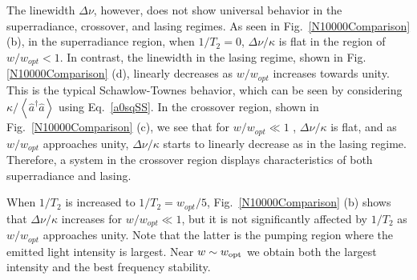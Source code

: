 \documentclass[aps,
twocolumn,
showpacs,
superscriptaddress,groupedaddress]{revtex4}
\begin{document}
The linewidth $\Delta \nu$, however, does not show universal behavior in
the superradiance, crossover, and lasing regimes. As seen in
Fig.~\ref{N10000Comparison} (b), in the superradiance region, when
$1/T_2=0$, $\Delta \nu / \kappa$ is flat in the region of $w/w_{opt}<1$.
In contrast, the linewidth in the lasing regime, shown in
Fig.\ref{N10000Comparison} (d), linearly decreases as $w/w_{opt}$
increases towards unity. This is the typical Schawlow-Townes behavior,
which can be seen by considering
$\kappa/\left<\hat{a}^{\dagger}\hat{a}\right>$ using Eq.~\ref{a0sqSS}.
In the crossover region, shown in Fig.~\ref{N10000Comparison} (c), we
see that for $w/w_{opt}\ll 1$ , $\Delta \nu/\kappa$ is flat, and as
$w/w_{opt}$ approaches unity, $\Delta \nu/\kappa$ starts to linearly
decrease as in the lasing regime. Therefore, a system in the crossover
region displays characteristics of both superradiance and lasing. 

When $1/T_2$ is increased to $1/T_2=w_{opt}/5$,
Fig.~\ref{N10000Comparison} (b) shows that $\Delta \nu/\kappa$ increases
for $w/w_{opt}\ll 1$, but it is not significantly affected by $1/T_2$ as
$w/w_{opt}$ approaches unity.  Note that the latter is the pumping
region where the emitted light intensity is largest.  Near $w\sim w_{\rm
opt}$ we obtain both the largest intensity and the best frequency
stability.
\end{document}

